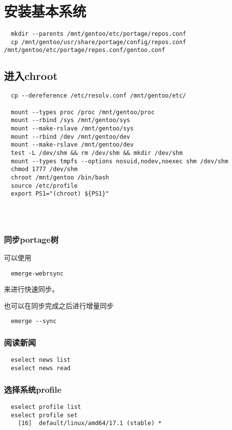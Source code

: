 

\chapter{安装基本系统}

\begin{lstlisting}
  mkdir --parents /mnt/gentoo/etc/portage/repos.conf
  cp /mnt/gentoo/usr/share/portage/config/repos.conf /mnt/gentoo/etc/portage/repos.conf/gentoo.conf
\end{lstlisting}

\section{进入chroot}
\begin{lstlisting}
  cp --dereference /etc/resolv.conf /mnt/gentoo/etc/

  mount --types proc /proc /mnt/gentoo/proc
  mount --rbind /sys /mnt/gentoo/sys
  mount --make-rslave /mnt/gentoo/sys
  mount --rbind /dev /mnt/gentoo/dev
  mount --make-rslave /mnt/gentoo/dev
  test -L /dev/shm && rm /dev/shm && mkdir /dev/shm
  mount --types tmpfs --options nosuid,nodev,noexec shm /dev/shm
  chmod 1777 /dev/shm
  chroot /mnt/gentoo /bin/bash
  source /etc/profile
  export PS1="(chroot) ${PS1}"


  
\end{lstlisting}

\subsection{同步portage树}
可以使用
\begin{lstlisting}
  emerge-webrsync
\end{lstlisting}
来进行快速同步。

也可以在同步完成之后进行增量同步

\begin{lstlisting}
  emerge --sync
\end{lstlisting}

\subsection{阅读新闻}
\begin{lstlisting}
  eselect news list
  eselect news read
\end{lstlisting}

\subsection{选择系统profile}
\begin{lstlisting}
  eselect profile list
  eselect profile set
    [16]  default/linux/amd64/17.1 (stable) *
\end{lstlisting}
